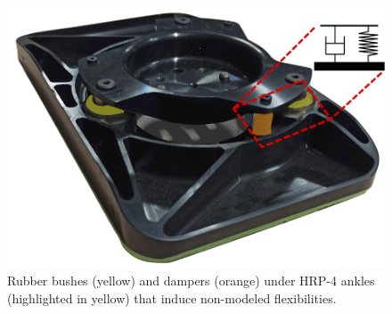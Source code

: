 \begin{figure}
	\centering
	\includegraphics[width=.5\columnwidth]{feet flexibilities2-model3.png}%
	\caption{Rubber bushes (yellow) and dampers (orange) under HRP-4 ankles (highlighted in yellow) that induce non-modeled flexibilities.}
	\label{fig:hrp soles}
\end{figure}

